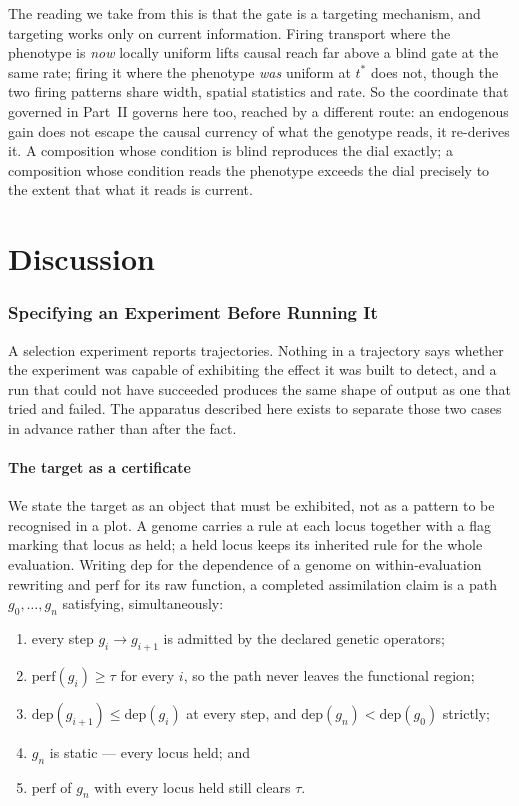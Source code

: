 \documentclass[man,12pt,floatsintext,donotrepeattitle]{apa7}
\begin{document}
The reading we take from this is that the gate is a targeting mechanism, and
targeting works only on current information. Firing transport where the
phenotype is \emph{now} locally uniform lifts causal reach far above a blind gate
at the same rate; firing it where the phenotype \emph{was} uniform at $t^{*}$
does not, though the two firing patterns share width, spatial statistics and
rate. So the coordinate that governed in Part~II governs here too, reached by a
different route: an endogenous gain does not escape the causal currency of what
the genotype reads, it re-derives it. A composition whose condition is blind
reproduces the dial exactly; a composition whose condition reads the phenotype
exceeds the dial precisely to the extent that what it reads is current.

\part*{Discussion}
\label{part:discussion}

\section{Specifying an Experiment Before Running It}
\label{sec:apparatus}

A selection experiment reports trajectories. Nothing in a trajectory says whether
the experiment was capable of exhibiting the effect it was built to detect, and a
run that could not have succeeded produces the same shape of output as one that
tried and failed. The apparatus described here exists to separate those two cases
in advance rather than after the fact.

\subsection{The target as a certificate}

We state the target as an object that must be exhibited, not as a pattern to be
recognised in a plot. A genome carries a rule at each locus together with a flag
marking that locus as held; a held locus keeps its inherited rule for the whole
evaluation. Writing $\mathrm{dep}$ for the dependence of a genome on
within-evaluation rewriting and $\mathrm{perf}$ for its raw function, a completed
assimilation claim is a path $g_0,\dots,g_n$ satisfying, simultaneously:

\begin{enumerate}
\item every step $g_i \to g_{i+1}$ is admitted by the declared genetic operators;
\item $\mathrm{perf}(g_i) \ge \tau$ for every $i$, so the path never leaves the
      functional region;
\item $\mathrm{dep}(g_{i+1}) \le \mathrm{dep}(g_i)$ at every step, and
      $\mathrm{dep}(g_n) < \mathrm{dep}(g_0)$ strictly;
\item $g_n$ is static --- every locus held; and
\item $\mathrm{perf}$ of $g_n$ with every locus held still clears $\tau$.
\end{enumerate}
\end{document}
